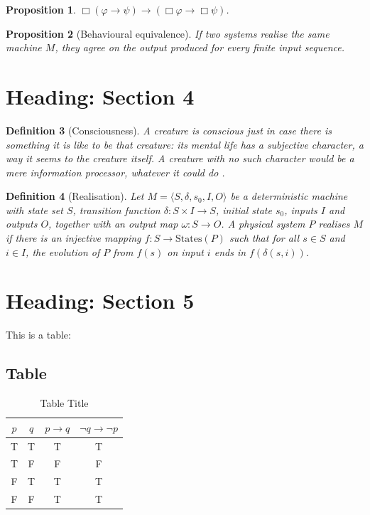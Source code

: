 \documentclass[12pt]{article}
\theoremstyle{plain}
\newtheorem{proposition}{Proposition}[section]
\theoremstyle{ospaicdefinition}
\newtheorem{definition}[proposition]{Definition}
\newcommand{\Necessarily}{\Box}
\begin{document}
\begin{proposition}\label{prop:k}
  $\Necessarily(\varphi \to \psi) \to
   (\Necessarily\varphi \to \Necessarily\psi)$.
\end{proposition}

\begin{proposition}[Behavioural equivalence]\label{prop:behavioural}
  If two systems realise the same machine $M$, they agree on the output
  produced for every finite input sequence.
\end{proposition}

\section{Heading: Section 4}\label{sec:four}

\begin{definition}[Consciousness]\label{def:consciousness}
  A creature is \emph{conscious} just in case there is something it is like to
  be that creature: its mental life has a subjective character, a way it seems
  to the creature itself. A creature with no such character would be a mere
  information processor, whatever it could do \autocite[435--450]{nagel1974}.
\end{definition}

\begin{definition}[Realisation]\label{def:realise}
  Let $M = \langle S, \delta, s_0, I, O \rangle$ be a deterministic machine
  with state set $S$, transition function $\delta \colon S \times I \to S$,
  initial state $s_0$, inputs $I$ and outputs $O$, together with an output map
  $\omega \colon S \to O$. A physical system $P$ \emph{realises} $M$ if there
  is an injective mapping $f \colon S \to \mathrm{States}(P)$ such that for all
  $s \in S$ and $i \in I$, the evolution of $P$ from $f(s)$ on input $i$ ends
  in $f(\delta(s,i))$.
\end{definition}

\section{Heading: Section 5}\label{sec:five}
This is a table: 
\subsection{Table}
\begin{table}[htbp]
	\centering
	\caption{Table Title}
	\begin{tabular}{cccc}
		\toprule
		$p$ & $q$ & $p \to q$ & $\neg q \to \neg p$ \\
		\midrule
		T & T & T & T \\
		T & F & F & F \\
		F & T & T & T \\
		F & F & T & T \\
		\bottomrule
	\end{tabular}
	\label{tab:table}
\end{table} 
\end{document}
